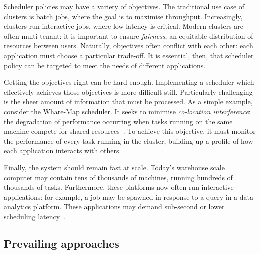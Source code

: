 Scheduler policies may have a variety of objectives. The traditional use case of clusters is batch jobs, where the goal is to maximise throughput. Increasingly, clusters run interactive jobs, where low latency is critical. Modern clusters are often multi-tenant: it is important to ensure \emph{fairness}, an equitable distribution of resources between users. Naturally, objectives often conflict with each other: each application must choose a particular trade-off. It is essential, then, that scheduler policy can be targeted to meet the needs of different applications.

Getting the objectives right can be hard enough. Implementing a scheduler which effectively achieves those objectives is more difficult still. Particularly challenging is the sheer amount of information that must be processed. As a simple example, consider the Whare-Map scheduler. It seeks to minimise \emph{co-location interference}: the degradation of performance occurring when tasks running on the same machine compete for shared resources~\cite{Mars:2013}\footnotemark. To achieve this objective, it must monitor the performance of every task running in the cluster, building up a profile of how each application interacts with others.

Finally, the system should remain fast at scale. Today's warehouse scale computer may contain tens of thousands of machines, running hundreds of thousands of tasks\footnotemark. Furthermore, these platforms now often run interactive applications: for example, a job may be spawned in response to a query in a data analytics platform. These applications may demand sub-second or lower scheduling latency~\cite{Ousterhout:2013}.

\subsection{Prevailing approaches}


